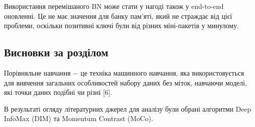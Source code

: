 Використання перемішаного BN може стати у нагоді також у end-to-end оновленні. Це не має значення для банку пам'яті, який не страждає від цієї проблеми, оскільки позитивні ключі були від різних міні-пакетів у минулому.

\vspace{1.5em}

\subsection{Висновки за розділом}

Порівняльне навчання $-$ це техніка машинного навчання, яка використовується для вивчення загальних особливостей набору даних без міток, навчаючи моделі, які точки даних подібні чи різні [6].

В результаті огляду літературних джерел для аналізу були обрані алгоритми Deep InfoMax (DIM) та Momentum Contrast (MoCo).
